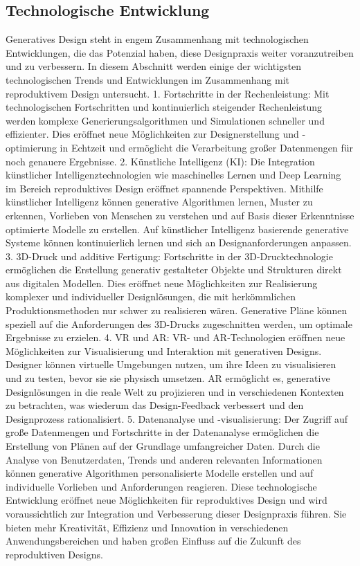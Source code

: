  \subsection*{Technologische Entwicklung}
 Generatives Design steht in engem Zusammenhang mit technologischen Entwicklungen, die das Potenzial haben, diese Designpraxis weiter voranzutreiben und zu verbessern. In diesem Abschnitt werden einige der wichtigsten technologischen Trends und Entwicklungen im Zusammenhang mit reproduktivem Design untersucht. 
 1. Fortschritte in der Rechenleistung: Mit  technologischen Fortschritten und kontinuierlich steigender Rechenleistung werden komplexe Generierungsalgorithmen und Simulationen schneller und effizienter. Dies eröffnet neue Möglichkeiten zur Designerstellung und -optimierung in Echtzeit und ermöglicht die Verarbeitung großer Datenmengen für noch genauere Ergebnisse.  2. Künstliche Intelligenz (KI): Die Integration künstlicher Intelligenztechnologien wie maschinelles Lernen und Deep Learning im Bereich reproduktives Design eröffnet spannende Perspektiven. Mithilfe künstlicher Intelligenz können generative Algorithmen lernen, Muster zu erkennen, Vorlieben von Menschen zu verstehen und auf Basis dieser Erkenntnisse optimierte Modelle zu erstellen. Auf künstlicher Intelligenz basierende generative Systeme können kontinuierlich lernen und sich an Designanforderungen anpassen. 
 3. 3D-Druck und additive Fertigung: Fortschritte in der 3D-Drucktechnologie ermöglichen die Erstellung generativ gestalteter Objekte und Strukturen direkt aus digitalen Modellen. Dies eröffnet neue Möglichkeiten zur Realisierung komplexer und individueller Designlösungen, die mit herkömmlichen Produktionsmethoden nur schwer zu realisieren wären. Generative Pläne können speziell auf die Anforderungen des 3D-Drucks zugeschnitten werden, um optimale Ergebnisse zu erzielen.  
 4. \ac*{VR} und \ac*{AR}: \ac*{VR}- und \ac*{AR}-Technologien eröffnen neue Möglichkeiten zur Visualisierung und Interaktion mit generativen Designs. Designer können virtuelle Umgebungen nutzen, um ihre Ideen zu visualisieren und zu testen,  bevor sie sie physisch umsetzen. \ac*{AR} ermöglicht es, generative Designlösungen in die reale Welt zu projizieren und  in verschiedenen Kontexten zu betrachten, was wiederum das Design-Feedback verbessert und den Designprozess rationalisiert. 
 5. Datenanalyse und -visualisierung: Der Zugriff auf große Datenmengen und  Fortschritte in der Datenanalyse ermöglichen die Erstellung von Plänen auf der Grundlage umfangreicher Daten. Durch die Analyse von Benutzerdaten, Trends und anderen relevanten Informationen können generative Algorithmen personalisierte Modelle erstellen und auf individuelle Vorlieben und Anforderungen reagieren.  Diese technologische Entwicklung eröffnet neue Möglichkeiten für reproduktives Design und wird voraussichtlich zur Integration und Verbesserung dieser Designpraxis führen. Sie bieten mehr Kreativität, Effizienz und Innovation in verschiedenen Anwendungsbereichen und haben großen Einfluss auf die Zukunft des reproduktiven Designs.

